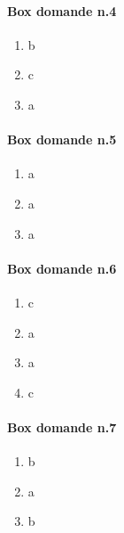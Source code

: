 \documentclass[8pt]{book}
\begin{document}
\paragraph{Box domande n.4}\label{box-domande-n.4}

\begin{enumerate}
\item
  b
\item
  c
\item
  a
\end{enumerate}

\paragraph{Box domande n.5}\label{box-domande-n.5}

\begin{enumerate}
\item
  a
\item
  a
\item
  a
\end{enumerate}

\paragraph{Box domande n.6}\label{box-domande-n.6}

\begin{enumerate}
\item
  c
\item
  a
\item
  a
\item
  c
\end{enumerate}

\paragraph{Box domande n.7}\label{box-domande-n.7}

\begin{enumerate}
\item
  b
\item
  a
\item
  b
\end{enumerate}
\end{document}
